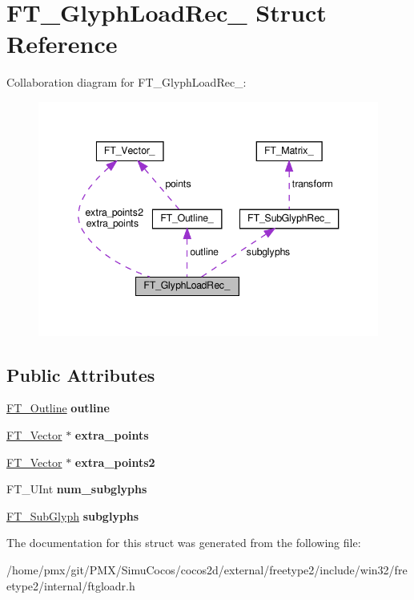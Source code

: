 \hypertarget{structFT__GlyphLoadRec__}{}\section{F\+T\+\_\+\+Glyph\+Load\+Rec\+\_\+ Struct Reference}
\label{structFT__GlyphLoadRec__}


Collaboration diagram for F\+T\+\_\+\+Glyph\+Load\+Rec\+\_\+\+:
\nopagebreak
\begin{figure}[H]
\begin{center}
\leavevmode
\includegraphics[width=343pt]{structFT__GlyphLoadRec____coll__graph}
\end{center}
\end{figure}
\subsection*{Public Attributes}
\begin{DoxyCompactItemize}
\item 
\mbox{\label{structFT__GlyphLoadRec___ae340cdb5263322e86c640b15f82ea72a}} 
\hyperlink{structFT__Outline__}{F\+T\+\_\+\+Outline} {\bfseries outline}
\item 
\mbox{\label{structFT__GlyphLoadRec___aaf6e2a8f3273a717ef973414582bf7ec}} 
\hyperlink{structFT__Vector__}{F\+T\+\_\+\+Vector} $\ast$ {\bfseries extra\+\_\+points}
\item 
\mbox{\label{structFT__GlyphLoadRec___a4fd1c0c2f28bcc7cb9ad8b8f93e43d80}} 
\hyperlink{structFT__Vector__}{F\+T\+\_\+\+Vector} $\ast$ {\bfseries extra\+\_\+points2}
\item 
\mbox{\label{structFT__GlyphLoadRec___a71dc4ab52b956b974fe65c95a098e03c}} 
F\+T\+\_\+\+U\+Int {\bfseries num\+\_\+subglyphs}
\item 
\mbox{\label{structFT__GlyphLoadRec___a12ef145fedbeb14cc8b9d320ae3fed96}} 
\hyperlink{structFT__SubGlyphRec__}{F\+T\+\_\+\+Sub\+Glyph} {\bfseries subglyphs}
\end{DoxyCompactItemize}


The documentation for this struct was generated from the following file\+:\begin{DoxyCompactItemize}
\item 
/home/pmx/git/\+P\+M\+X/\+Simu\+Cocos/cocos2d/external/freetype2/include/win32/freetype2/internal/ftgloadr.\+h\end{DoxyCompactItemize}
